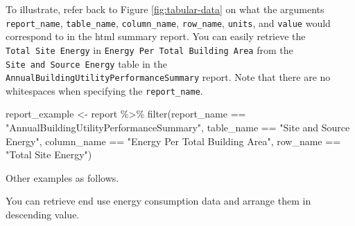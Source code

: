 \documentclass[
]{book}
\newenvironment{Shaded}{\begin{snugshade}}{\end{snugshade}}
\newcommand{\DocumentationTok}[1]{\textcolor[rgb]{0.56,0.35,0.01}{\textbf{\textit{#1}}}}
\newcommand{\FunctionTok}[1]{\textcolor[rgb]{0.00,0.00,0.00}{#1}}
\newcommand{\NormalTok}[1]{#1}
\newcommand{\OtherTok}[1]{\textcolor[rgb]{0.56,0.35,0.01}{#1}}
\newcommand{\SpecialCharTok}[1]{\textcolor[rgb]{0.00,0.00,0.00}{#1}}
\newcommand{\StringTok}[1]{\textcolor[rgb]{0.31,0.60,0.02}{#1}}
\begin{document}
\begin{Shaded}
\end{Shaded}

To illustrate, refer back to Figure \ref{fig:tabular-data} on what the arguments \texttt{report\_name}, \texttt{table\_name}, \texttt{column\_name}, \texttt{row\_name}, \texttt{units}, and \texttt{value} would correspond to in the html summary report. You can easily retrieve the \texttt{Total\ Site\ Energy} in \texttt{Energy\ Per\ Total\ Building\ Area} from the \texttt{Site\ and\ Source\ Energy} table in the \texttt{AnnualBuildingUtilityPerformanceSummary} report. Note that there are no whitespaces when specifying the \texttt{report\_name}.

\begin{Shaded}
\begin{Highlighting}[]
\NormalTok{report\_example }\OtherTok{\textless{}{-}}\NormalTok{ report }\SpecialCharTok{\%\textgreater{}\%}
    \FunctionTok{filter}\NormalTok{(report\_name }\SpecialCharTok{==} \StringTok{"AnnualBuildingUtilityPerformanceSummary"}\NormalTok{, }
\NormalTok{           table\_name }\SpecialCharTok{==} \StringTok{"Site and Source Energy"}\NormalTok{,}
\NormalTok{           column\_name }\SpecialCharTok{==} \StringTok{"Energy Per Total Building Area"}\NormalTok{,}
\NormalTok{           row\_name }\SpecialCharTok{==} \StringTok{"Total Site Energy"}\NormalTok{)}
\end{Highlighting}
\end{Shaded}

Other examples as follows.

You can retrieve end use energy consumption data and arrange them in descending value.
\end{document}
